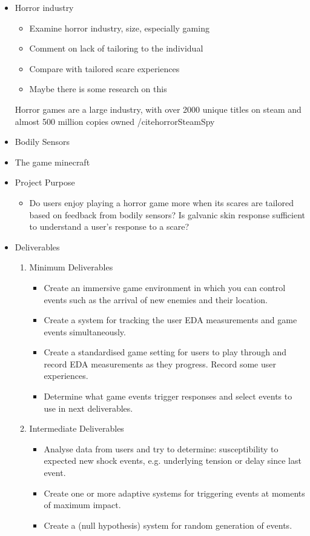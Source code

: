 \documentclass[12pt,a4paper]{article}
\begin{document}
	\begin{itemize}
		\item Horror industry
		\begin{itemize}
			\item Examine horror industry, size, especially gaming
			\item Comment on lack of tailoring to the individual
			\item Compare with tailored scare experiences
			\item Maybe there is some research on this
		\end{itemize}
	Horror games are a large industry, with over 2000 unique titles on steam and almost 500 million copies owned /cite{horrorSteamSpy}
	
		\item Bodily Sensors
		
		\item The game minecraft
		
		\item Project Purpose
		\begin{itemize}
			\item Do users enjoy playing a horror game more when its scares are tailored based on feedback from bodily sensors? Is galvanic skin response sufficient to understand a user's response to a scare?
		\end{itemize}
		
		\item Deliverables
		\begin{enumerate}
			\item Minimum Deliverables
			\begin{itemize}
				\item Create an immersive game environment in which you can control events such as the arrival of new enemies and their location.
				\item Create a system for tracking the user EDA measurements and game events simultaneously.
				\item Create a standardised game setting for users to play through and record EDA measurements as they progress. Record some user experiences.
				\item Determine what game events trigger responses and select events to use in next deliverables.
			\end{itemize}
			
			\item Intermediate Deliverables
			\begin{itemize}
				\item Analyse data from users and try to determine: susceptibility to expected new shock events, e.g. underlying tension or delay since last event.
				\item Create one or more adaptive systems for triggering events at moments of maximum impact.
				\item Create a (null hypothesis) system for random generation of events.
			\end{itemize}
			

\end{enumerate}
\end{itemize}
\end{document}
